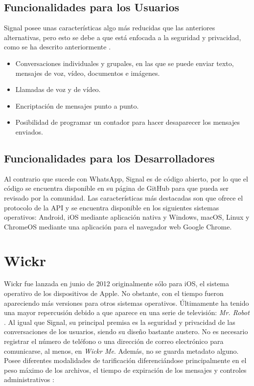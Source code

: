 \newpage

\subsection{Funcionalidades para los Usuarios}
Signal posee unas características algo más reducidas que las anteriores alternativas, pero esto se debe a que está enfocada a la seguridad y privacidad, como se ha descrito anteriormente \cite{Signal2017}.

\begin{itemize}
	\item Conversaciones individuales y grupales, en las que se puede enviar texto, mensajes de voz, vídeo, documentos e imágenes.
	\item Llamadas de voz y de vídeo.
	\item Encriptación de mensajes punto a punto.
	\item Posibilidad de programar un contador para hacer desaparecer los mensajes enviados.
\end{itemize}

\subsection{Funcionalidades para los Desarrolladores}
Al contrario que sucede con WhatsApp, Signal es de código abierto, por lo que el código se encuentra disponible en su página de GitHub para que pueda ser revisado por la comunidad. Las características más destacadas son que ofrece el protocolo de la \acs{API} y se encuentra disponible en los siguientes sistemas operativos: Android, iOS mediante aplicación nativa y Windows, macOS, Linux y ChromeOS mediante una aplicación para el navegador web Google Chrome.

\section{Wickr}
\label{sec:wickr}

Wickr fue lanzada en junio de 2012 originalmente sólo para iOS, el sistema operativo de los dispositivos de Apple. No obstante, con el tiempo fueron apareciendo más versiones para otros sistemas operativos. Últimamente ha tenido una mayor repercusión debido a que aparece en una serie de televisión: \textit{Mr. Robot} \cite{Elio2016}. Al igual que Signal, su principal premisa es la seguridad y privacidad de las conversaciones de los usuarios, siendo su diseño bastante austero. No es necesario registrar el número de teléfono o una dirección de correo electrónico para comunicarse, al menos, en \textit{Wickr Me}. Además, no se guarda metadato alguno. Posee diferentes modalidades de tarificación diferenciándose principalmente en el peso máximo de los archivos, el tiempo de expiración de los mensajes y controles administrativos \cite{Wickr2017}:

